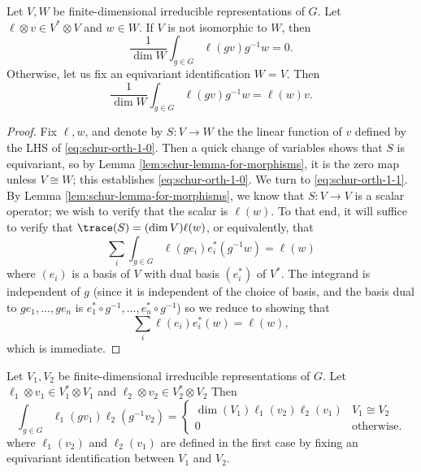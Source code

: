 \documentclass[reqno]{amsart} 
\begin{document}
\begin{lemma}\label{lem:schur-ortho-in-useful-form}
  Let $V,W$ be finite-dimensional irreducible representations
  of $G$.
  Let $\ell \otimes v \in V^* \otimes V$
  and $w \in W$.
  If $V$ is not isomorphic to $W$,
  then
  \begin{equation}\label{eq:schur-orth-1-0}
    \frac{1}{\dim W}
    \int_{g \in G} \ell(g v) g^{-1} w
    = 0.
  \end{equation}
  Otherwise,
  let us fix an equivariant identification
  $W = V$.
  Then
  \begin{equation}\label{eq:schur-orth-1-1}
    \frac{1}{\dim W}
    \int_{g \in G} \ell(g v) g^{-1} w
    = \ell(w) v.
  \end{equation}
\end{lemma}
\begin{proof}
  Fix $\ell,w$, and denote by $S : V \rightarrow W$ the
  the linear function of $v$ defined by the LHS of
  \eqref{eq:schur-orth-1-0}.
  Then a quick change of variables shows that $S$ is
  equivariant,
  so by Lemma \ref{lem:schur-lemma-for-morphisms},
  it is the zero map unless $V \cong W$;
  this establishes \eqref{eq:schur-orth-1-0}.
  We turn to \eqref{eq:schur-orth-1-1}.
  By Lemma \ref{lem:schur-lemma-for-morphisms},
  we know that $S : V \rightarrow V$ is a scalar operator;
  we wish to verify that the scalar is $\ell(w)$.
  To that end,
  it will suffice to verify that $\trace(S) = (\dim V) \ell(w)$,
  or equivalently,
  that
  \begin{equation*}
  \sum_{i}
  \int_{g \in G} \ell(g e_i) e_i^*(g^{-1} w)
  = \ell(w)
  \end{equation*}
  where $(e_i)$ is a basis of $V$ with dual basis $(e_i^*)$ of $V^*$.
  The integrand is independent of $g$
  (since it is independent of the choice of basis,
  and the basis dual to $g e_1,\dotsc,g e_n$ is $e_1^* \circ g^{-1}, \dotsc, e_n^* \circ g^{-1}$)
  so we reduce to showing that
  \begin{equation*}
  \sum_i \ell(e_i) e_i^*(w) = \ell(w),
  \end{equation*}
  which is immediate.
\end{proof}

\begin{corollary}
  Let
  $V_1, V_2$ be finite-dimensional irreducible representations
  of $G$.
  Let $\ell_1 \otimes v_1 \in V_1^* \otimes V_1$
  and $\ell_2 \otimes v_2 \in V_2^* \otimes V_2$
  Then
  \begin{equation}\label{eq:schur-orth-1-0}
    \int_{g \in G} \ell_1(g v_1) \ell_2(g^{-1} v_2)
    =
    \begin{cases}
      \dim(V_1) \ell_1(v_2) \ell_2(v_1) & V_1 \cong V_2 \\
      0 & \text{otherwise.}
    \end{cases}
  \end{equation} 
  where $\ell_1(v_2)$ and $\ell_2(v_1)$ are defined
  in the first case by fixing an equivariant identification between $V_1$ and $V_2$.
\end{corollary}
\end{document}
